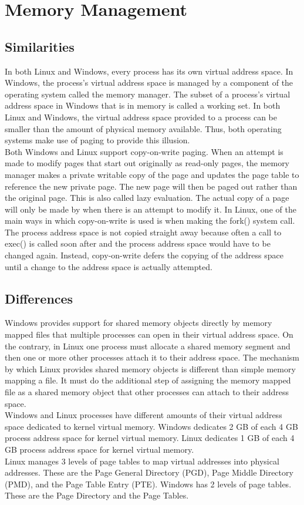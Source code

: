 \documentclass[letterpaper,10pt,titlepage]{article}
\begin{document}
\section{Memory Management}
\subsection{Similarities}
In both Linux and Windows, every process has its own virtual address space.
In Windows, the process's virtual address space is managed by a component
of the operating system called the memory manager. The subset of a process's
virtual address space in Windows that is in memory is called a working set.
In both Linux and Windows, the virtual address space provided to a process
can be smaller than the amount of physical memory available. Thus, both 
operating systems make use of paging to provide this illusion.
\\
\linebreak
Both Windows and Linux support copy-on-write paging. When an attempt is made
to modify pages that start out originally as read-only pages, the memory 
manager makes a private writable copy of the page and updates the page table 
to reference the new private page. The new page will then be paged out rather
than the original page. This is also called lazy evaluation. The actual copy
of a page will only be made by when there is an attempt to modify it. In 
Linux, one of the main ways in which copy-on-write is used is when making the
fork() system call. The process address space is not copied straight away 
because often a call to exec() is called soon after and the process address
space would have to be changed again. Instead, copy-on-write defers the 
copying of the address space until a change to the address space is actually 
attempted.
\subsection{Differences}
Windows provides support for shared memory objects directly by memory 
mapped files that multiple processes can open in their virtual address space.
On the contrary, in Linux one process must allocate a shared memory segment and
then one or more other processes attach it to their address space. The 
mechanism by which Linux provides shared memory objects is different than 
simple memory mapping a file. It must do the additional step of assigning the
memory mapped file as a shared memory object that other processes can attach
to their address space.
\\
\linebreak
Windows and Linux processes have different amounts of their virtual address
space dedicated to kernel virtual memory. Windows dedicates 2 GB of each 4 GB
process address space for kernel virtual memory. Linux dedicates 1 GB of each
4 GB process address space for kernel virtual memory.
\\ 
\linebreak
Linux manages 3 levels of page tables to map virtual addresses into physical
addresses. These are the Page General Directory (PGD), Page Middle Directory
(PMD), and the Page Table Entry (PTE). Windows has 2 levels of page tables. 
These are the Page Directory and the Page Tables.
\end{document}
